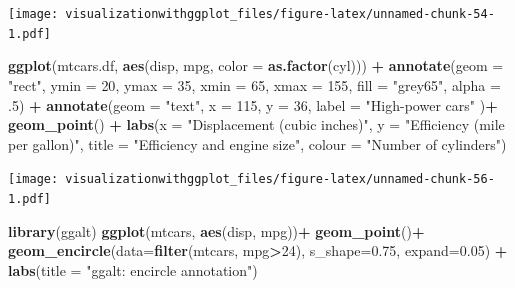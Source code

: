 \documentclass[]{krantz}
\makeatletter
\newenvironment{Shaded}{\begin{snugshade}}{\end{snugshade}}
\newcommand{\KeywordTok}[1]{\textcolor[rgb]{0.13,0.29,0.53}{\textbf{#1}}}
\newcommand{\DataTypeTok}[1]{\textcolor[rgb]{0.13,0.29,0.53}{#1}}
\newcommand{\DecValTok}[1]{\textcolor[rgb]{0.00,0.00,0.81}{#1}}
\newcommand{\FloatTok}[1]{\textcolor[rgb]{0.00,0.00,0.81}{#1}}
\newcommand{\StringTok}[1]{\textcolor[rgb]{0.31,0.60,0.02}{#1}}
\newcommand{\OperatorTok}[1]{\textcolor[rgb]{0.81,0.36,0.00}{\textbf{#1}}}
\newcommand{\NormalTok}[1]{#1}
\newenvironment{kframe}{%
\medskip{}
\setlength{\fboxsep}{.8em}
 \def\at@end@of@kframe{}%
 \ifinner\ifhmode%
  \def\at@end@of@kframe{\end{minipage}}%
  \begin{minipage}{\columnwidth}%
 \fi\fi%
 \def\FrameCommand##1{\hskip\@totalleftmargin \hskip-\fboxsep
 \colorbox{shadecolor}{##1}\hskip-\fboxsep
     \hskip-\linewidth \hskip-\@totalleftmargin \hskip\columnwidth}%
 \MakeFramed {\advance\hsize-\width
   \@totalleftmargin\z@ \linewidth\hsize
   \@setminipage}}%
 {\par\unskip\endMakeFramed%
 \at@end@of@kframe}
\renewenvironment{Shaded}{\begin{kframe}}{\end{kframe}}
\theoremstyle{definition}
\theoremstyle{definition}
\theoremstyle{definition}
\theoremstyle{remark}
\makeatother
\begin{document}
\texttt{[image: visualizationwithggplot\_files/figure-latex/unnamed-chunk-54-1.pdf]}

\begin{Shaded}
\begin{Highlighting}[]
\KeywordTok{ggplot}\NormalTok{(mtcars.df, }\KeywordTok{aes}\NormalTok{(disp,  mpg, }\DataTypeTok{color =} \KeywordTok{as.factor}\NormalTok{(cyl))) }\OperatorTok{+}\StringTok{  }
\StringTok{ }\KeywordTok{annotate}\NormalTok{(}\DataTypeTok{geom =} \StringTok{"rect"}\NormalTok{, }
    \DataTypeTok{ymin =} \DecValTok{20}\NormalTok{, }\DataTypeTok{ymax =} \DecValTok{35}\NormalTok{, }\DataTypeTok{xmin =} \DecValTok{65}\NormalTok{, }\DataTypeTok{xmax =} \DecValTok{155}\NormalTok{, }\DataTypeTok{fill =} \StringTok{"grey65"}\NormalTok{, }\DataTypeTok{alpha =}\NormalTok{ .}\DecValTok{5}\NormalTok{) }\OperatorTok{+}\StringTok{  }
\StringTok{ }\KeywordTok{annotate}\NormalTok{(}\DataTypeTok{geom =} \StringTok{"text"}\NormalTok{, }\DataTypeTok{x =} \DecValTok{115}\NormalTok{, }\DataTypeTok{y =} \DecValTok{36}\NormalTok{, }\DataTypeTok{label =} \StringTok{"High-power cars"}\NormalTok{ )}\OperatorTok{+}\StringTok{ }
\StringTok{ }\KeywordTok{geom_point}\NormalTok{() }\OperatorTok{+}\StringTok{  }
\StringTok{ }\KeywordTok{labs}\NormalTok{(}\DataTypeTok{x =} \StringTok{"Displacement (cubic inches)"}\NormalTok{, }\DataTypeTok{y =} \StringTok{"Efficiency (mile per gallon)"}\NormalTok{,            }\DataTypeTok{title =} \StringTok{"Efficiency and engine size"}\NormalTok{, }\DataTypeTok{colour =} \StringTok{"Number of cylinders"}\NormalTok{)}
\end{Highlighting}
\end{Shaded}

\texttt{[image: visualizationwithggplot\_files/figure-latex/unnamed-chunk-56-1.pdf]}

\begin{Shaded}
\begin{Highlighting}[]
\KeywordTok{library}\NormalTok{(ggalt) }
\KeywordTok{ggplot}\NormalTok{(mtcars, }\KeywordTok{aes}\NormalTok{(disp, mpg))}\OperatorTok{+}\StringTok{ }
\KeywordTok{geom_point}\NormalTok{()}\OperatorTok{+}\StringTok{    }
\KeywordTok{geom_encircle}\NormalTok{(}\DataTypeTok{data=}\KeywordTok{filter}\NormalTok{(mtcars, mpg}\OperatorTok{>}\DecValTok{24}\NormalTok{), }\DataTypeTok{s_shape=}\FloatTok{0.75}\NormalTok{, }\DataTypeTok{expand=}\FloatTok{0.05}\NormalTok{) }\OperatorTok{+}\StringTok{   }
\KeywordTok{labs}\NormalTok{(}\DataTypeTok{title =} \StringTok{"ggalt: encircle annotation"}\NormalTok{)}
\end{Highlighting}
\end{Shaded}
\end{document}

